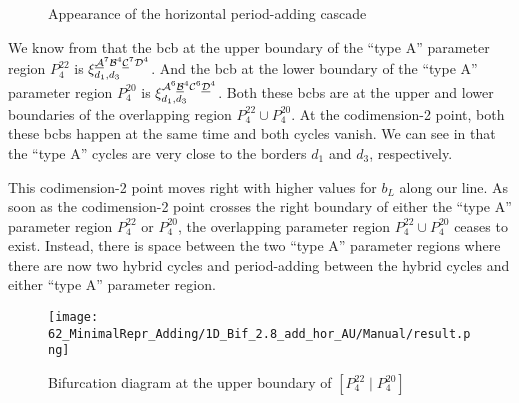 \begin{figure}
	\centering
	\caption{Appearance of the horizontal period-adding cascade}
\end{figure}

We know from  that the \gls{bcb} at the upper boundary of the ``type A'' parameter region $P^{22}_4$ is $\xi_{d_1, d_3}^{\underline{\mathcal{A}}^7\mathcal{B}^4\underline{\mathcal{C}}^7\mathcal{D}^4}$.
And the \gls{bcb} at the lower boundary of the ``type A'' parameter region $P^{20}_4$ is $\xi_{d_1, d_3}^{\mathcal{A}^6\underline{\mathcal{B}}^4\mathcal{C}^6\underline{\mathcal{D}}^4}$.
Both these \glspl{bcb} are at the upper and lower boundaries of the overlapping region $P^{22}_4 \cup P^{20}_4$.
At the codimension-2 point, both these \glspl{bcb} happen at the same time and both cycles vanish.
We can see in  that the ``type A'' cycles are very close to the borders $d_1$ and $d_3$, respectively.

This codimension-2 point moves right with higher values for $b_L$ along our line.
As soon as the codimension-2 point crosses the right boundary of either the ``type A'' parameter region $P^{22}_4$ or $P^{20}_4$, the overlapping parameter region $P^{22}_4 \cup P^{20}_4$ ceases to exist.
Instead, there is space between the two ``type A'' parameter regions where there are now two hybrid cycles and period-adding between the hybrid cycles and either ``type A'' parameter region.

\begin{figure}
	\centering
	\texttt{[image: 62\_MinimalRepr\_Adding/1D\_Bif\_2.8\_add\_hor\_AU/Manual/result.png]}
	\caption{Bifurcation diagram at the upper boundary of $\left[P^{22}_4 \mid P^{20}_4\right]$}
	\label{fig:add.change.appa.hor.bif}
\end{figure}


